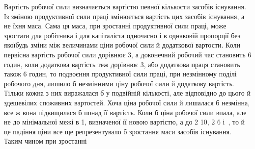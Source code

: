 Вартість робочої сили визначається вартістю певної кількости
засобів існування. Із зміною продуктивної сили праці змінюється
вартість цих засобів існування, а не їхня маса. Сама ця
маса, при зростанні продуктивної сили праці, може зростати для
робітника і для капіталіста одночасно і в однаковій пропорції
без якоїбудь зміни між величинами ціни робочої сили й додаткової
вартости. Коли первісна вартість робочої сили дорівнює 3,
а доконечний робочий час становить 6 годин, коли додаткова
вартість теж дорівнює 3, або додаткова праця
становить також 6 годин, то подвоєння продуктивної сили праці,
при незмінному поділі робочого дня, лишило б незмінними ціну
робочої сили й додаткову вартість. Тільки кожна з них виражалася
б у подвійній кількості, але відповідно до цього й здешевілих
споживних вартостей. Хоча ціна робочої сили й лишалася б
незмінна, все ж вона підвищилася б понад її вартість. Коли б
ціна робочої сили впала, але не до мінімальної межі в 1,
визначеної її новою вартістю, а до 2 10, 2
6 і~, то й це падіння ціни все ще репрезентувало б
зростання маси засобів існування. Таким чином при зростанні
\parbreak{}  %
